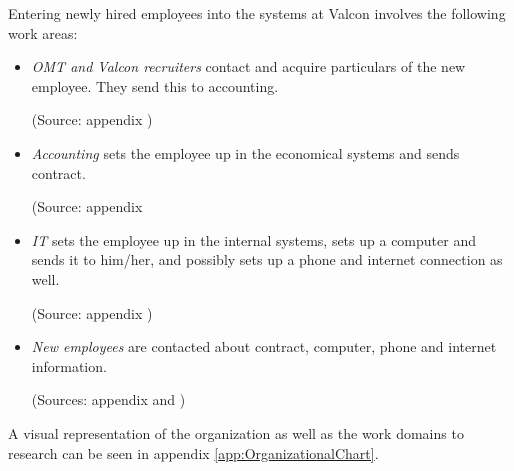 Entering newly hired employees into the systems at Valcon involves the following work areas:

\begin{itemize}
\item \emph{OMT and Valcon recruiters} contact and acquire particulars of the new employee. They send this to accounting. 

(Source: appendix )

\item \emph{Accounting} sets the employee up in the economical systems and sends contract. 

(Source: appendix 

\item \emph{IT} sets the employee up in the internal systems, sets up a computer and sends it to him/her, and possibly sets up a phone and internet connection as well. 

(Source: appendix )

\item \emph{New employees} are contacted about contract, computer, phone and internet information. 

(Sources: appendix  and )

\end{itemize}

A visual representation of the organization as well as the work domains to research can be seen in appendix \ref{app:OrganizationalChart}.